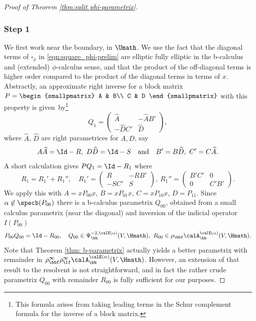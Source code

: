 \begin{proof}[Proof of Theorem \ref{thm:split phi-parametrix}]
\subsubsection*{Step 1}
We first work near the boundary, \ie in $\Umath$.
We use the fact that the diagonal terms of $\square_\phi$ in \eqref{eqn:square_phi-prelim} are elliptic \resp fully elliptic in the
b-calculus and (extended) $\phi$-calculus sense, and that the product of the off-diagonal terms is higher order compared to the product of the diagonal terms in terms of $x$.
Abstractly, an approximate right inverse for a block matrix $P=
\begin{smallpmatrix}
A & B\\ C & D
\end{smallpmatrix}
$ with this property is given~by\footnote{This formula arises from taking leading terms
in the Schur complement formula for the inverse of a block matrix.}
\begin{equation}\label{Q1}
Q_1= \begin{pmatrix}
\widehat{A} & - \widehat{A} B' \\ -\widehat{D} C' & \widehat{D}
\end{pmatrix},
\end{equation}
where $\widehat{A}$, $\widehat{D}$ are right parametrices for $A,D$, say
\[
A\widehat{A}=\Id - R,\ D\widehat{D}=\Id-S\quad\text{and}\quad B' = B\widehat{D},\ C'=C\widehat{A}.
\]
A short calculation gives $PQ_1=\Id - R_1 $ where
\[
R_1=R_1'+R_1'', \quad R_1' =
\begin{pmatrix}
R & -RB' \\
-SC' & S
\end{pmatrix}
,\ R_1'' =
\begin{pmatrix}
B'C' & 0\\
0 & C'B'
\end{pmatrix}.
\]
We apply this with $A=xP_{00}x$, $B=xP_{01}x$, $C=xP_{10}x$, $D=P_{11}$.
Since $\alpha\not\in \specb(P_{00})$ there is a b-calculus parametrix $Q_{00}$,
obtained from a small calculus parametrix (near the diagonal) and inversion of the
indicial operator $I(P_{00})$
\begin{equation}
\label{eqn:Q00 R00}
P_{00}Q_{00} = \Id - R_{00},\quad Q_{00}\in\Psi_\bb^{-2,\calE(\alpha)}(V,\Hmath),\
R_{00}\in \rho_\bbf \calA_\bb^{\calE(\alpha)}(V,\Hmath).
\end{equation}
Note that Theorem \ref{thm: b-parametrix} actually yields a better parametrix
with remainder in $\rho^\infty_\bbf\rho^\infty_\lf \calA_\bb^{\calE(\alpha)}(V,\Hmath)$.
However, an extension of that result to the resolvent is not straightforward,
and in fact the rather crude parametrix $Q_{00}$ with remainder $R_{00}$
is fully sufficient for our purposes.


\end{proof}
